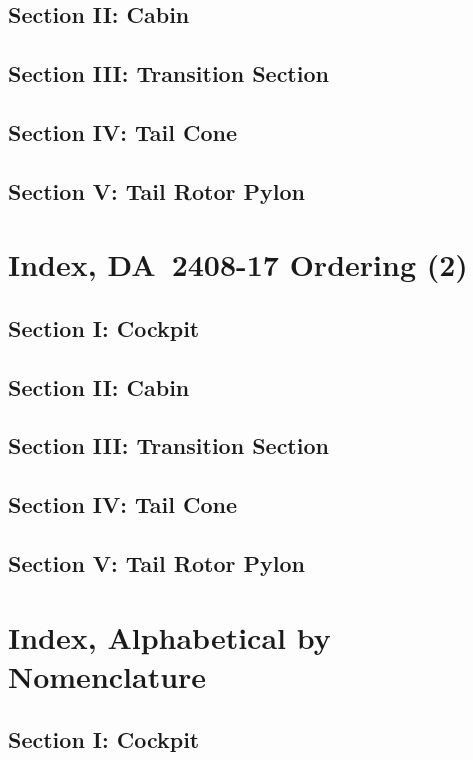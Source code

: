 \documentclass[letterpaper,11pt,openany,oneside]{book}
\begin{document}
\section{Section II: Cabin}

\clearpage
\section{Section III: Transition Section}

\clearpage
\section{Section IV: Tail Cone}

\clearpage
\section{Section V: Tail Rotor Pylon}

\chapter{Index, DA~2408-17 Ordering (2)}
\section{Section I: Cockpit}

\clearpage
\section{Section II: Cabin}

\clearpage
\section{Section III: Transition Section}

\clearpage
\section{Section IV: Tail Cone}

\clearpage
\section{Section V: Tail Rotor Pylon}

\chapter{Index, Alphabetical by Nomenclature}
\section{Section I: Cockpit}

\clearpage
\end{document}
